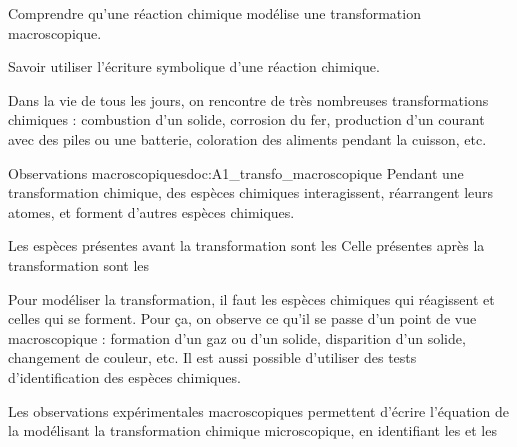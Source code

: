 \teteSndChim


\begin{objectifs}
  \item Comprendre qu'une réaction chimique modélise une transformation macroscopique.
  \item Savoir utiliser l'écriture symbolique d'une réaction chimique.
\end{objectifs}

\begin{contexte}
  Dans la vie de tous les jours, on rencontre de très nombreuses transformations chimiques : combustion d'un solide, corrosion du fer, production d'un courant avec des piles ou une batterie, coloration des aliments pendant la cuisson, etc.
  
\end{contexte}


\begin{doc}{Observations macroscopiques}{doc:A1_transfo_macroscopique}
  Pendant une transformation chimique, des espèces chimiques interagissent, réarrangent leurs atomes, et forment d'autres espèces chimiques.

  \begin{encart}  
    Les espèces présentes avant la transformation sont les 
    Celle présentes après la transformation sont les 
  \end{encart}
  
  Pour modéliser la transformation, il faut  les espèces chimiques qui réagissent et celles qui se forment.
  Pour ça, on observe ce qu'il se passe d'un point de vue macroscopique : formation d'un gaz ou d'un solide, disparition d'un solide, changement de couleur, etc.
  Il est aussi possible d'utiliser des tests d'identification des espèces chimiques.
  
  \begin{encart}
    Les observations expérimentales macroscopiques permettent d'écrire l'équation de la  modélisant la transformation chimique microscopique, en identifiant les  et les 
  \end{encart}
\end{doc}

